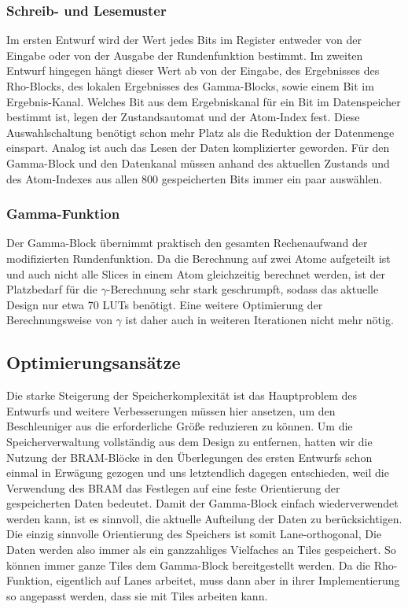 \subsubsection{Schreib- und Lesemuster}
Im ersten Entwurf wird der Wert jedes Bits im Register entweder von der Eingabe oder von der Ausgabe der Rundenfunktion bestimmt.
Im zweiten Entwurf hingegen hängt dieser Wert ab von der Eingabe, des Ergebnisses des Rho-Blocks, des lokalen Ergebnisses des Gamma-Blocks, sowie einem Bit im Ergebnis-Kanal.
Welches Bit aus dem Ergebniskanal für ein Bit im Datenspeicher bestimmt ist, legen der Zustandsautomat und der Atom-Index fest.
Diese Auswahlschaltung benötigt schon mehr Platz als die Reduktion der Datenmenge einspart.
Analog ist auch das Lesen der Daten komplizierter geworden. Für den Gamma-Block und den Datenkanal müssen
anhand des aktuellen Zustands und des Atom-Indexes aus allen 800 gespeicherten Bits immer ein paar auswählen.

\subsubsection{Gamma-Funktion}
Der Gamma-Block übernimmt praktisch den gesamten Rechenaufwand der modifizierten Rundenfunktion. Da die Berechnung auf
zwei Atome aufgeteilt ist und auch nicht alle Slices in einem Atom gleichzeitig berechnet werden, ist der Platzbedarf für
die $\gamma$-Berechnung sehr stark geschrumpft, sodass das aktuelle Design nur etwa 70 LUTs benötigt.
Eine weitere Optimierung der Berechnungsweise von $\gamma$ ist daher auch in weiteren Iterationen nicht mehr nötig.

\subsection{Optimierungsansätze}
Die starke Steigerung der Speicherkomplexität ist das Hauptproblem des Entwurfs und weitere Verbesserungen müssen hier ansetzen,
um den Beschleuniger aus die erforderliche Größe reduzieren zu können. Um die Speicherverwaltung vollständig aus dem Design zu entfernen,
hatten wir die Nutzung der BRAM-Blöcke in den Überlegungen des ersten Entwurfs schon einmal in Erwägung gezogen und uns letztendlich dagegen entschieden,
weil die Verwendung des BRAM das Festlegen auf eine feste Orientierung der gespeicherten Daten bedeutet. Damit der Gamma-Block einfach wiederverwendet werden kann,
ist es sinnvoll, die aktuelle Aufteilung der Daten zu berücksichtigen. Die einzig sinnvolle Orientierung des Speichers ist somit Lane-orthogonal,
Die Daten werden also immer als ein ganzzahliges Vielfaches an Tiles gespeichert. So können immer ganze Tiles dem Gamma-Block bereitgestellt werden.
Da die Rho-Funktion, eigentlich auf Lanes arbeitet, muss dann aber in ihrer Implementierung so angepasst werden, dass sie mit Tiles arbeiten kann.

